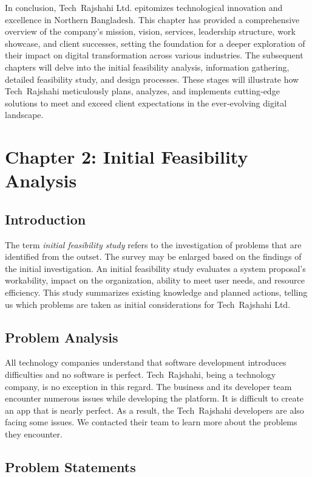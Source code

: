 \documentclass[12pt,a4paper]{article}
\begin{document}
In conclusion, Tech Rajshahi Ltd. epitomizes technological innovation and excellence in Northern Bangladesh.  This chapter has provided a comprehensive overview of the company’s mission, vision, services, leadership structure, work showcase, and client successes, setting the foundation for a deeper exploration of their impact on digital transformation across various industries.  The subsequent chapters will delve into the initial feasibility analysis, information gathering, detailed feasibility study, and design processes.  These stages will illustrate how Tech Rajshahi meticulously plans, analyzes, and implements cutting‑edge solutions to meet and exceed client expectations in the ever‑evolving digital landscape.

\newpage

\section{Chapter 2: Initial Feasibility Analysis}

\subsection{Introduction}
The term \emph{initial feasibility study} refers to the investigation of problems that are identified from the outset.  The survey may be enlarged based on the findings of the initial investigation.  An initial feasibility study evaluates a system proposal’s workability, impact on the organization, ability to meet user needs, and resource efficiency.  This study summarizes existing knowledge and planned actions, telling us which problems are taken as initial considerations for Tech Rajshahi Ltd.

\subsection{Problem Analysis}
All technology companies understand that software development introduces difficulties and no software is perfect.  Tech Rajshahi, being a technology company, is no exception in this regard.  The business and its developer team encounter numerous issues while developing the platform.  It is difficult to create an app that is nearly perfect.  As a result, the Tech Rajshahi developers are also facing some issues.  We contacted their team to learn more about the problems they encounter.

\subsection{Problem Statements}
\end{document}
